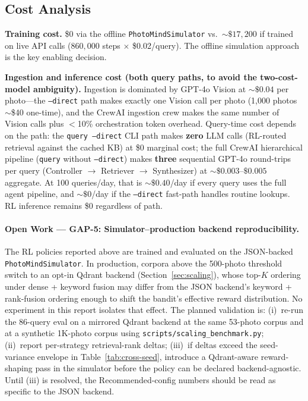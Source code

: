 \documentclass[11pt,letterpaper]{article}
\begin{document}
\subsection{Cost Analysis}

\textbf{Training cost.} \$0 via the offline \texttt{PhotoMindSimulator} vs.\ ${\sim}\$17{,}200$ if trained on live API calls ($860{,}000$ steps $\times$ \$0.02/query). The offline simulation approach is the key enabling decision.

\textbf{Ingestion and inference cost (both query paths, to avoid the two-cost-model ambiguity).} Ingestion is dominated by GPT-4o Vision at ${\sim}\$0.04$ per photo---the \texttt{--direct} path makes exactly one Vision call per photo (1{,}000 photos ${\sim}$\$40 one-time), and the CrewAI ingestion crew makes the same number of Vision calls plus $<$10\% orchestration token overhead. Query-time cost depends on the path: the \texttt{query --direct} CLI path makes \textbf{zero} LLM calls (RL-routed retrieval against the cached KB) at \$0 marginal cost; the full CrewAI hierarchical pipeline (\texttt{query} without \texttt{--direct}) makes \textbf{three} sequential GPT-4o round-trips per query (Controller $\to$ Retriever $\to$ Synthesizer) at ${\sim}\$0.003$--$\$0.005$ aggregate. At 100 queries/day, that is ${\sim}\$0.40$/day if every query uses the full agent pipeline, and ${\sim}\$0$/day if the \texttt{--direct} fast-path handles routine lookups. RL inference remains \$0 regardless of path.

\paragraph{Open Work --- GAP-5: Simulator--production backend reproducibility.} The RL policies reported above are trained and evaluated on the JSON-backed \texttt{PhotoMindSimulator}. In production, corpora above the 500-photo threshold switch to an opt-in Qdrant backend (Section~\ref{sec:scaling}), whose top-$K$ ordering under dense + keyword fusion may differ from the JSON backend's keyword + rank-fusion ordering enough to shift the bandit's effective reward distribution. No experiment in this report isolates that effect. The planned validation is: (i)~re-run the 86-query eval on a mirrored Qdrant backend at the same 53-photo corpus and at a synthetic 1K-photo corpus using \texttt{scripts/scaling\_benchmark.py}; (ii)~report per-strategy retrieval-rank deltas; (iii)~if deltas exceed the seed-variance envelope in Table~\ref{tab:cross-seed}, introduce a Qdrant-aware reward-shaping pass in the simulator before the policy can be declared backend-agnostic. Until (iii) is resolved, the Recommended-config numbers should be read as specific to the JSON backend.
\end{document}
